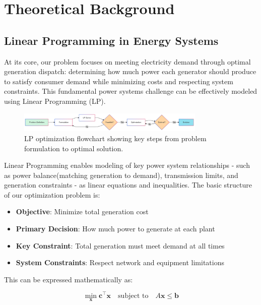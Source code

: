 \newpage
\section{Theoretical Background}

\subsection{Linear Programming in Energy Systems}

At its core, our problem focuses on meeting electricity demand through optimal generation dispatch:
determining how much power each generator should produce to satisfy consumer demand while minimizing costs 
and respecting system constraints. This fundamental power systems challenge can be effectively modeled using 
Linear Programming (LP).
\begin{figure}[h]
    \centering
    \includegraphics[width=0.8\textwidth]{images/lp_flowchart.png}
    \caption{LP optimization flowchart showing key steps from problem formulation to optimal solution.} \label{fig:lp_flowchart}
\end{figure}

Linear Programming enables modeling of key power system relationships - such as power balance(matching
generation to demand), transmission limits, and generation constraints - as linear equations and inequalities. 
The basic structure of our optimization problem is:

\begin{itemize}
    \item \textbf{Objective}: Minimize total generation cost
    \item \textbf{Primary Decision}: How much power to generate at each plant
    \item \textbf{Key Constraint}: Total generation must meet demand at all times
    \item \textbf{System Constraints}: Respect network and equipment limitations
\end{itemize}

This can be expressed mathematically as:

\begin{equation}
    \min_{\mathbf{x}} \mathbf{c}^\top \mathbf{x} \quad \text{subject to} \quad A\mathbf{x} \leq \mathbf{b}
\end{equation}

